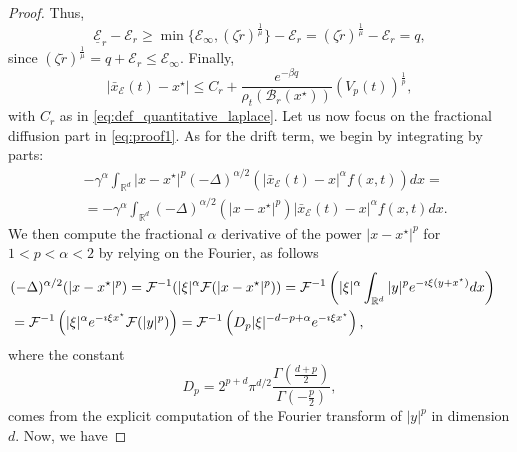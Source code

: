 \documentclass[11pt,handout]{article}%
\numberwithin{equation}{section}
\newcommand{\R}{\mathbb R}
\theoremstyle{definition}
\begin{document}
\begin{proof}
	Thus,
	\begin{equation*}
		\underline{\mathcal{E}}_r - \mathcal{E}_r \geq \min \{\mathcal{E}_\infty, (\zeta \tilde{r})^{\frac{1}{\mu}} \} - \mathcal{E}_r  = (\zeta \tilde{r})^{\frac{1}{\mu}} - \mathcal{E}_r = q,
	\end{equation*}
	since $(\zeta \tilde{r})^{\frac{1}{\mu}} = q+\mathcal{E}_r \leq \mathcal{E}_\infty$.  Finally,
	\begin{equation}\label{eq:estimate1} 
		\vert \bar{x}_\mathcal{E}(t) - x^\star \vert \leq  C_r + \frac{e^{-\beta q} }{\rho_t(\mathcal{B}_r(x^\star))}  (V_p(t))^{\frac{1}{p}},  
	\end{equation}
	with $C_r$ as in \eqref{eq:def_quantitative_laplace}. 
	Let us now focus on the fractional diffusion part in \eqref{eq:proof1}. As for the drift term, we begin by integrating by parts: 
	\begin{equation}\label{eq:proof_diffusion1} 
		\begin{split}
			&-\gamma^\alpha \int_{\R^d} \vert x-x^\star \vert^p (-\Delta)^{\alpha/2}\left(  \vert \bar{x}_\mathcal{E}(t)-x\vert^\alpha f(x,t)\right)  dx =\\ &= -\gamma^\alpha \int_{\R^d} (-\Delta)^{\alpha/2} ( \vert x-x^\star\vert^p) \vert \bar{x}_\mathcal{E}(t)-x\vert^\alpha f(x,t) dx. 
		\end{split}
	\end{equation}
	We then compute the fractional $\alpha$ derivative of the power $\vert x-x^\star\vert^p$ for $1<p<\alpha<2$ by relying on the  Fourier, as follows 
	\begin{equation}\label{eq:x_p}
		\begin{split}
			&(-\Delta)^{\alpha/2} ( \vert x-x^\star\vert^p) = \mathcal{F}^{-1} (\vert \xi \vert^\alpha \mathcal{F}(\vert x-x^\star \vert^p )) = \mathcal{F}^{-1}\left(\vert \xi \vert^\alpha \int_{\R^d} \vert y \vert^p e^{-\imath \xi (y+x^\star)} dx\right) \cr
			& = \mathcal{F}^{-1}\left( \vert \xi \vert^\alpha e^{-\imath \xi x^\star} \mathcal{F}(\vert y \vert^p) \right) =  \mathcal{F}^{-1}\left( D_p \vert \xi \vert^{-d-p+\alpha} e^{-\imath \xi x^\star}  \right),
		\end{split}
	\end{equation}
	where the constant
	\begin{equation*}
		D_p =  2^{p+d} \pi^{d/2} \frac{\Gamma(\frac{d+p}{2})}{\Gamma(-\frac{p}{2})},
	\end{equation*}
	comes from the  explicit computation of the Fourier transform of $\vert y \vert^p$ in dimension $d$. Now, we have

\end{proof}
\end{document}
